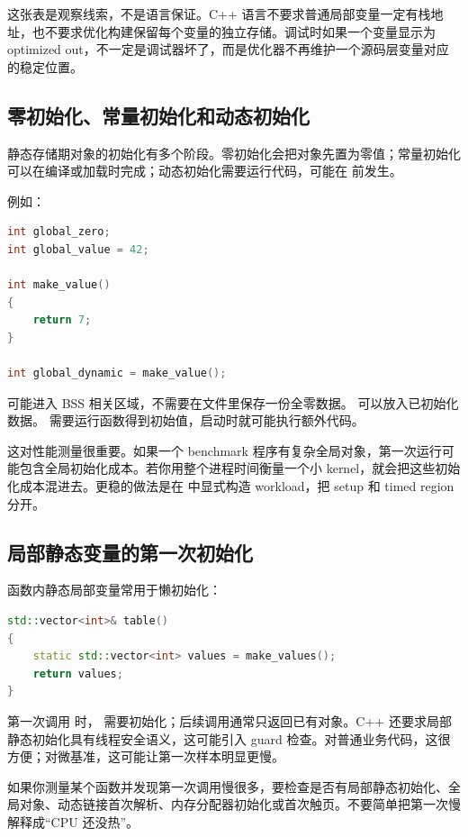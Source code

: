 这张表是观察线索，不是语言保证。C++ 语言不要求普通局部变量一定有栈地址，也不要求优化构建保留每个变量的独立存储。调试时如果一个变量显示为 optimized out，不一定是调试器坏了，而是优化器不再维护一个源码层变量对应的稳定位置。

\subsection{零初始化、常量初始化和动态初始化}

静态存储期对象的初始化有多个阶段。零初始化会把对象先置为零值；常量初始化可以在编译或加载时完成；动态初始化需要运行代码，可能在  前发生。

例如：

\begin{lstlisting}[language=C++]
int global_zero;
int global_value = 42;

int make_value()
{
    return 7;
}

int global_dynamic = make_value();
\end{lstlisting}

 可能进入 BSS 相关区域，不需要在文件里保存一份全零数据。 可以放入已初始化数据。 需要运行函数得到初始值，启动时就可能执行额外代码。

这对性能测量很重要。如果一个 benchmark 程序有复杂全局对象，第一次运行可能包含全局初始化成本。若你用整个进程时间衡量一个小 kernel，就会把这些初始化成本混进去。更稳的做法是在  中显式构造 workload，把 setup 和 timed region 分开。

\subsection{局部静态变量的第一次初始化}

函数内静态局部变量常用于懒初始化：

\begin{lstlisting}[language=C++]
std::vector<int>& table()
{
    static std::vector<int> values = make_values();
    return values;
}
\end{lstlisting}

第一次调用  时， 需要初始化；后续调用通常只返回已有对象。C++ 还要求局部静态初始化具有线程安全语义，这可能引入 guard 检查。对普通业务代码，这很方便；对微基准，这可能让第一次样本明显更慢。

如果你测量某个函数并发现第一次调用慢很多，要检查是否有局部静态初始化、全局对象、动态链接首次解析、内存分配器初始化或首次触页。不要简单把第一次慢解释成“CPU 还没热”。

